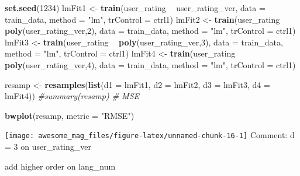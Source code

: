 \documentclass[]{article}
\newenvironment{Shaded}{\begin{snugshade}}{\end{snugshade}}
\newcommand{\KeywordTok}[1]{\textcolor[rgb]{0.13,0.29,0.53}{\textbf{#1}}}
\newcommand{\DataTypeTok}[1]{\textcolor[rgb]{0.13,0.29,0.53}{#1}}
\newcommand{\DecValTok}[1]{\textcolor[rgb]{0.00,0.00,0.81}{#1}}
\newcommand{\StringTok}[1]{\textcolor[rgb]{0.31,0.60,0.02}{#1}}
\newcommand{\CommentTok}[1]{\textcolor[rgb]{0.56,0.35,0.01}{\textit{#1}}}
\newcommand{\OperatorTok}[1]{\textcolor[rgb]{0.81,0.36,0.00}{\textbf{#1}}}
\newcommand{\NormalTok}[1]{#1}
\begin{document}
\begin{Shaded}
\begin{Highlighting}[]
\KeywordTok{set.seed}\NormalTok{(}\DecValTok{1234}\NormalTok{)}
\NormalTok{lmFit1 <-}\StringTok{ }\KeywordTok{train}\NormalTok{(user_rating }\OperatorTok{~}\StringTok{ }\NormalTok{user_rating_ver,}
                \DataTypeTok{data =}\NormalTok{ train_data, }
                \DataTypeTok{method =} \StringTok{"lm"}\NormalTok{,}
                \DataTypeTok{trControl =}\NormalTok{ ctrl1) }
\NormalTok{lmFit2 <-}\StringTok{ }\KeywordTok{train}\NormalTok{(user_rating }\OperatorTok{~}\StringTok{ }\KeywordTok{poly}\NormalTok{(user_rating_ver,}\DecValTok{2}\NormalTok{),}
                \DataTypeTok{data =}\NormalTok{ train_data, }
                \DataTypeTok{method =} \StringTok{"lm"}\NormalTok{,}
                \DataTypeTok{trControl =}\NormalTok{ ctrl1)}
\NormalTok{lmFit3 <-}\StringTok{ }\KeywordTok{train}\NormalTok{(user_rating }\OperatorTok{~}\StringTok{ }\KeywordTok{poly}\NormalTok{(user_rating_ver,}\DecValTok{3}\NormalTok{),}
                \DataTypeTok{data =}\NormalTok{ train_data, }
                \DataTypeTok{method =} \StringTok{"lm"}\NormalTok{,}
                \DataTypeTok{trControl =}\NormalTok{ ctrl1)}
\NormalTok{lmFit4 <-}\StringTok{ }\KeywordTok{train}\NormalTok{(user_rating }\OperatorTok{~}\StringTok{ }\KeywordTok{poly}\NormalTok{(user_rating_ver,}\DecValTok{4}\NormalTok{),}
                \DataTypeTok{data =}\NormalTok{ train_data, }
                \DataTypeTok{method =} \StringTok{"lm"}\NormalTok{,}
                \DataTypeTok{trControl =}\NormalTok{ ctrl1)}

\NormalTok{resamp <-}\StringTok{ }\KeywordTok{resamples}\NormalTok{(}\KeywordTok{list}\NormalTok{(}\DataTypeTok{d1 =}\NormalTok{ lmFit1, }\DataTypeTok{d2 =}\NormalTok{ lmFit2, }\DataTypeTok{d3 =}\NormalTok{ lmFit3, }\DataTypeTok{d4 =}\NormalTok{ lmFit4)) }
\CommentTok{#summary(resamp) # MSE}

\KeywordTok{bwplot}\NormalTok{(resamp, }\DataTypeTok{metric =} \StringTok{"RMSE"}\NormalTok{)}
\end{Highlighting}
\end{Shaded}

\texttt{[image: awesome\_mag\_files/figure-latex/unnamed-chunk-16-1]}
Comment: d = 3 on user\_rating\_ver

add higher order on lang\_num
\end{document}
